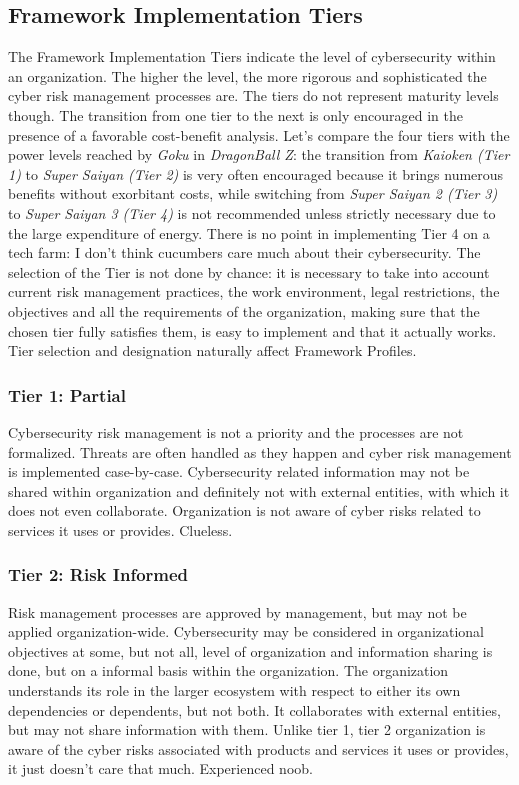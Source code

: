 \subsection{Framework Implementation Tiers}
The Framework Implementation Tiers indicate the level of cybersecurity within an organization. The higher the level, the more rigorous and sophisticated the cyber risk management processes are. The tiers do not represent maturity levels though. The transition from one tier to the next is only encouraged in the presence of a favorable cost-benefit analysis. Let's compare the four tiers with the power levels reached by \textit{Goku} in \textit{DragonBall Z}: the transition from \textit{Kaioken (Tier 1)} to \textit{Super Saiyan (Tier 2)} is very often encouraged because it brings numerous benefits without exorbitant costs, while switching from \textit{Super Saiyan 2 (Tier 3)} to \textit{Super Saiyan 3 (Tier 4)} is not recommended unless strictly necessary due to the large expenditure of energy. There is no point in implementing Tier 4 on a tech farm: I don't think cucumbers care much about their cybersecurity. The selection of the Tier is not done by chance: it is necessary to take into account current risk management practices, the work environment, legal restrictions, the objectives and all the requirements of the organization, making sure that the chosen tier fully satisfies them, is easy to implement and that it actually works. Tier selection and designation naturally affect Framework Profiles.
\subsubsection{Tier 1: Partial}
Cybersecurity risk management is not a priority and the processes are not formalized. Threats are often handled as they happen and cyber risk management is implemented case-by-case. Cybersecurity related information may not be shared within organization and definitely not with external entities, with which it does not even collaborate. Organization is not aware of cyber risks related to services it uses or provides. Clueless.
\subsubsection{Tier 2: Risk Informed}
Risk management processes are approved by management, but may not be applied organization-wide. Cybersecurity may be considered in organizational objectives at some, but not all, level of organization and information sharing is done, but on a informal basis within the organization. The organization understands its role in the larger ecosystem with respect to either its own dependencies or dependents, but not both. It collaborates with external entities, but may not share information with them. Unlike tier 1, tier 2 organization is aware of the cyber risks associated with products and services it uses or provides, it just doesn't care that much. Experienced noob.
